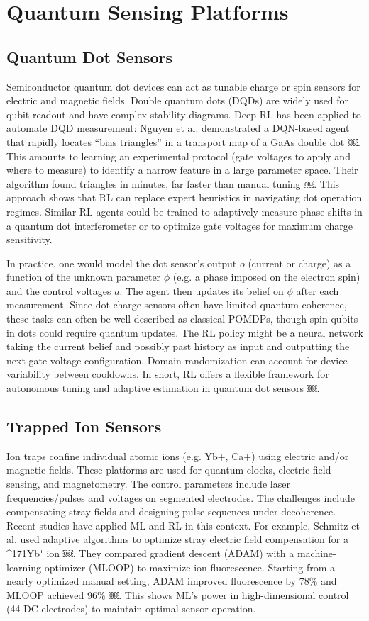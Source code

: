 \documentclass[
    aps,
    prx,
    reprint,
    superscriptaddress,
    amsmath,
    amssymb,
    longbibliography
]{revtex4-2}
\begin{document}
\section{Quantum Sensing Platforms}

\subsection{Quantum Dot Sensors}

Semiconductor quantum dot devices can act as tunable charge or spin
sensors for electric and magnetic fields. Double quantum dots (DQDs)
are widely used for qubit readout and have complex stability
diagrams. Deep RL has been applied to automate DQD measurement: Nguyen
et al. demonstrated a DQN-based agent that rapidly locates “bias
triangles” in a transport map of a GaAs double dot ￼. This amounts to
learning an experimental protocol (gate voltages to apply and where to
measure) to identify a narrow feature in a large parameter
space. Their algorithm found triangles in minutes, far faster than
manual tuning ￼. This approach shows that RL can replace expert
heuristics in navigating dot operation regimes. Similar RL agents
could be trained to adaptively measure phase shifts in a quantum dot
interferometer or to optimize gate voltages for maximum charge
sensitivity.

In practice, one would model the dot sensor’s output $o$ (current or
charge) as a function of the unknown parameter $\phi$ (e.g. a phase
imposed on the electron spin) and the control voltages $a$. The agent
then updates its belief on $\phi$ after each measurement. Since dot
charge sensors often have limited quantum coherence, these tasks can
often be well described as classical POMDPs, though spin qubits in
dots could require quantum updates. The RL policy might be a neural
network taking the current belief and possibly past history as input
and outputting the next gate voltage configuration. Domain
randomization can account for device variability between cooldowns.
In short, RL offers a flexible framework for autonomous tuning and
adaptive estimation in quantum dot sensors ￼.


\subsection{Trapped Ion Sensors}

Ion traps confine individual atomic ions (e.g. Yb+, Ca+) using
electric and/or magnetic fields. These platforms are used for quantum
clocks, electric-field sensing, and magnetometry. The control
parameters include laser frequencies/pulses and voltages on segmented
electrodes. The challenges include compensating stray fields and
designing pulse sequences under decoherence. Recent studies have
applied ML and RL in this context. For example, Schmitz et al. used
adaptive algorithms to optimize stray electric field compensation for
a ^171Yb⁺ ion ￼. They compared gradient descent (ADAM) with a
machine-learning optimizer (MLOOP) to maximize ion
fluorescence. Starting from a nearly optimized manual setting, ADAM
improved fluorescence by 78$\%$ and MLOOP achieved 96$\%$ ￼.  This shows
ML’s power in high-dimensional control (44 DC electrodes) to maintain
optimal sensor operation.
\end{document}

